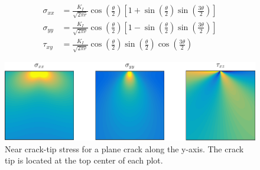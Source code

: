 \begin{align}
	\sigma_{xx} & =  \frac{K_I}{\sqrt{2\pi r}} \cos\left(\frac{\theta}{2}\right) \left[ 1+\sin\left(\frac{\theta}{2} \right)\sin\left( \frac{3\theta}{2}\right)\right]\\
	\sigma_{yy} & =  \frac{K_I}{\sqrt{2\pi r}} \cos\left(\frac{\theta}{2}\right) \left[ 1-\sin\left(\frac{\theta}{2} \right)\sin\left( \frac{3\theta}{2}\right)\right]\\	
	\tau_{xy} & =  \frac{K_I}{\sqrt{2\pi r}} \cos\left(\frac{\theta}{2}\right)\sin\left(\frac{\theta}{2} \right)\cos\left( \frac{3\theta}{2}\right)
\end{align}

\begin{figure}
\centering
\includegraphics[width=\textwidth]{../figures/thesis/analytic_stress.pdf}
\caption{Near crack-tip stress for a plane crack along the y-axis. The crack tip is located at the top center of each plot.}
\label{fig:analytic_stress}
\end{figure}

